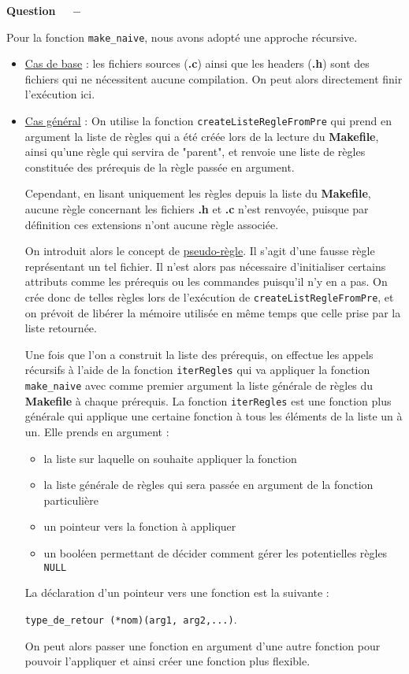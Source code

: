 \documentclass[11pt]{article}
\newcounter{question}[section]
\newenvironment{question}[1][]{\refstepcounter{question}\par\medskip
   \noindent\textbf{Question~\thequestion ~ $-$} \rmfamily}{}
\begin{document}
\begin{question} %

Pour la fonction \texttt{make\_naive}, nous avons adopté une approche récursive.
\begin{itemize}
	\item \underline{Cas de base} : les fichiers sources (\textbf{.c}) ainsi que les headers (\textbf{.h}) sont des fichiers qui ne nécessitent aucune compilation.
	On peut alors directement finir l'exécution ici.
	\item \underline{Cas général} : On utilise la fonction \texttt{createListeRegleFromPre} qui prend en argument la liste de règles qui a été créée lors de la lecture du \textbf{Makefile}, ainsi qu'une règle qui servira de "parent",
	et renvoie une liste de règles constituée des prérequis de la règle passée en argument.

	Cependant, en lisant uniquement les règles depuis la liste du \textbf{Makefile}, aucune règle concernant les fichiers \textbf{.h} et \textbf{.c} n'est renvoyée, puisque par définition ces extensions n'ont aucune règle associée.

	On introduit alors le concept de \underline{pseudo-règle}. Il s'agit d'une fausse règle représentant un tel fichier. Il n'est alors pas nécessaire d'initialiser certains attributs comme les prérequis ou les commandes puisqu'il n'y en a pas.
	On crée donc de telles règles lors de l'exécution de \texttt{createListRegleFromPre}, et on prévoit de libérer la mémoire utilisée en même temps que celle prise par la liste retournée.

	Une fois que l'on a construit la liste des prérequis, on effectue les appels récursifs à l'aide de la fonction \texttt{iterRegles} qui va appliquer la fonction \texttt{make\_naive} avec comme premier argument la liste générale de règles du \textbf{Makefile} à chaque prérequis.
	La fonction \texttt{iterRegles} est une fonction plus générale qui applique une certaine fonction à tous les éléments de la liste un à un.
	Elle prends en argument : 
	\begin{itemize}
		\item la liste sur laquelle on souhaite appliquer la fonction
		\item la liste générale de règles qui sera passée en argument de la fonction particulière
		\item un pointeur vers la fonction à appliquer
		\item un booléen permettant de décider comment gérer les potentielles règles \texttt{NULL}
	\end{itemize}
	La déclaration d'un pointeur vers une fonction est la suivante \cite{functionPointers} : 
	\begin{center}
		\texttt{type\_de\_retour  (*nom)(arg1, arg2,...)}. 
	\end{center}
	On peut alors passer une fonction en argument d'une autre fonction pour pouvoir l'appliquer et ainsi créer une fonction plus flexible. 


\end{itemize}
\end{question}
\end{document}
